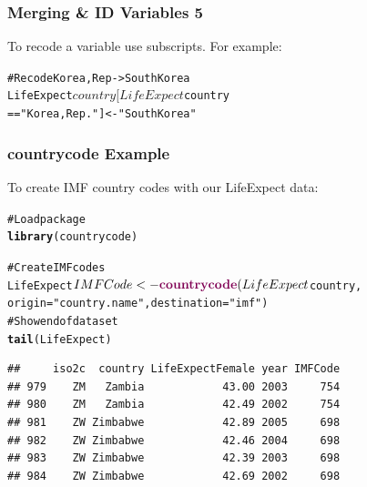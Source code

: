 \documentclass{beamer}\usepackage{graphicx, color}
\makeatletter
\newcommand{\hlfunctioncall}[1]{\textcolor[rgb]{0.501960784313725,0,0.329411764705882}{\textbf{#1}}}%
\newcommand{\hlstring}[1]{\textcolor[rgb]{0.6,0.6,1}{#1}}%
\newcommand{\hlcomment}[1]{\textcolor[rgb]{0.180392156862745,0.6,0.341176470588235}{#1}}%
\newenvironment{kframe}{%
 \def\at@end@of@kframe{}%
 \ifinner\ifhmode%
  \def\at@end@of@kframe{\end{minipage}}%
  \begin{minipage}{\columnwidth}%
 \fi\fi%
 \def\FrameCommand##1{\hskip\@totalleftmargin \hskip-\fboxsep
 \colorbox{shadecolor}{##1}\hskip-\fboxsep
     \hskip-\linewidth \hskip-\@totalleftmargin \hskip\columnwidth}%
 \MakeFramed {\advance\hsize-\width
   \@totalleftmargin\z@ \linewidth\hsize
   \@setminipage}}%
 {\par\unskip\endMakeFramed%
 \at@end@of@kframe}
\newenvironment{knitrout}{}{} %
\makeatother
\begin{document}

\begin{frame}[fragile]
  \frametitle{Merging \& ID Variables 5}
  To recode a variable use subscripts. For example:
\begin{knitrout}
\color{fgcolor}\begin{kframe}
\begin{alltt}
\hlcomment{# Recode Korea, Rep -> SouthKorea}
LifeExpect$country[LifeExpect$country 
                   == \hlstring{"Korea, Rep."}] <- \hlstring{"SouthKorea"}
\end{alltt}
\end{kframe}
\end{knitrout}

\end{frame}


\begin{frame}[fragile]
  \frametitle{countrycode Example}
  To create IMF country codes with our LifeExpect data:
\begin{knitrout}
\color{fgcolor}\begin{kframe}
\begin{alltt}
\hlcomment{# Load package}
\hlfunctioncall{library}(countrycode)

\hlcomment{# Create IMF codes}
LifeExpect$IMFCode <- \hlfunctioncall{countrycode}(LifeExpect$country, 
    origin = \hlstring{"country.name"}, destination = \hlstring{"imf"})
\hlcomment{# Show end of data set}
\hlfunctioncall{tail}(LifeExpect)
\end{alltt}
\begin{verbatim}
##     iso2c  country LifeExpectFemale year IMFCode
## 979    ZM   Zambia            43.00 2003     754
## 980    ZM   Zambia            42.49 2002     754
## 981    ZW Zimbabwe            42.89 2005     698
## 982    ZW Zimbabwe            42.46 2004     698
## 983    ZW Zimbabwe            42.39 2003     698
## 984    ZW Zimbabwe            42.69 2002     698
\end{verbatim}
\end{kframe}
\end{knitrout}

\end{frame}
\end{document}

